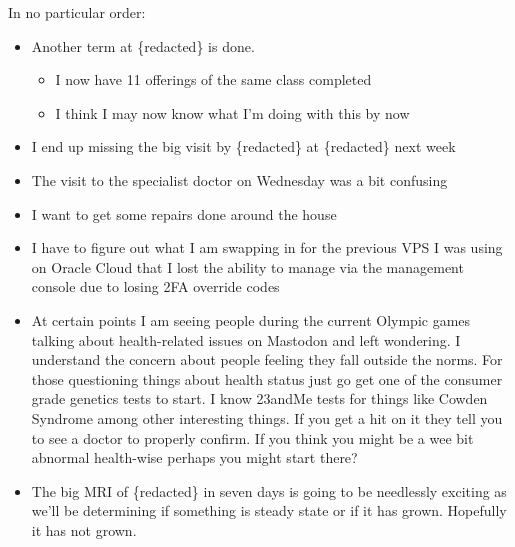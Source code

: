 In no particular order:

\begin{itemize}
\item
  Another term at \{redacted\} is done.

  \begin{itemize}
  \item
    I now have 11 offerings of the same class completed
  \item
    I think I may now know what I'm doing with this by now
  \end{itemize}
\item
  I end up missing the big visit by \{redacted\} at \{redacted\} next
  week
\item
  The visit to the specialist doctor on Wednesday was a bit confusing
\item
  I want to get some repairs done around the house
\item
  I have to figure out what I am swapping in for the previous VPS I was
  using on Oracle Cloud that I lost the ability to manage via the
  management console due to losing 2FA override codes
\item
  At certain points I am seeing people during the current Olympic games
  talking about health-related issues on Mastodon and left wondering. I
  understand the concern about people feeling they fall outside the
  norms. For those questioning things about health status just go get
  one of the consumer grade genetics tests to start. I know 23andMe
  tests for things like Cowden Syndrome among other interesting things.
  If you get a hit on it they tell you to see a doctor to properly
  confirm. If you think you might be a wee bit abnormal health-wise
  perhaps you might start there?
\item
  The big MRI of \{redacted\} in seven days is going to be needlessly
  exciting as we'll be determining if something is steady state or if it
  has grown. Hopefully it has not grown.
\end{itemize}
